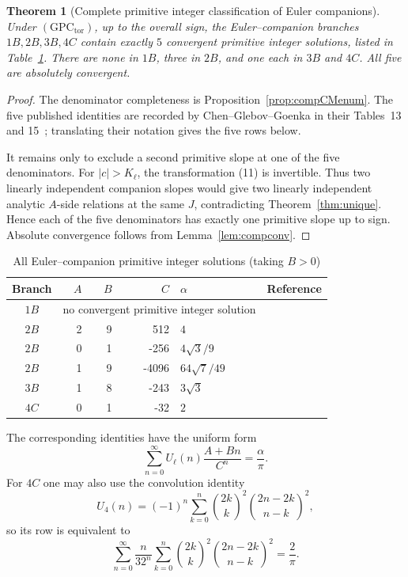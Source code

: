 \documentclass[11pt,a4paper]{amsart} %
\newtheorem{theorem}{Theorem}[section]
\theoremstyle{definition}
\begin{document}
\begin{theorem}[Complete primitive integer classification of Euler companions]
\label{thm:compcomplete}
Under \((\mathrm{GPC}_{\mathrm{tor}})\), up to the overall sign, the
Euler--companion branches \(1B,2B,3B,4C\) contain exactly \(5\) convergent
primitive integer solutions, listed in Table~\ref{tab:companion}. There are
none in \(1B\), three in \(2B\), and one each in \(3B\) and \(4C\). All five
are absolutely convergent.
\end{theorem}

\begin{proof}
The denominator completeness is Proposition~\ref{prop:compCMenum}. The five
published identities are recorded by Chen--Glebov--Goenka in their
Tables~13 and 15~\cite{CGG}; translating their notation gives the five rows
below.

It remains only to exclude a second primitive slope at one of the five
denominators. For \(|c|>K_\ell\), the transformation (11) is invertible.
Thus two linearly independent companion slopes would give two linearly
independent analytic \(A\)-side relations at the same \(J\), contradicting
Theorem~\ref{thm:unique}. Hence each of the five denominators has exactly one
primitive slope up to sign. Absolute convergence follows from
Lemma~\ref{lem:compconv}.
\end{proof}

\begin{table}[htbp]
\centering
\caption{All Euler--companion primitive integer solutions (taking \(B>0\))}
\label{tab:companion}
\small
\setlength{\tabcolsep}{5pt}
\renewcommand{\arraystretch}{1.18}
\begin{tabular}{@{}c r r r l l@{}}
\toprule
Branch & \(A\) & \(B\) & \(C\) & \(\alpha\) & Reference\\
\midrule
\(1B\)&\multicolumn{4}{c}{no convergent primitive integer solution}&\\
\(2B\)&2&9&512&\(4\)&\cite[Table~15]{CGG}\\
\(2B\)&0&1&-256&\(4\sqrt3/9\)&\cite[Table~15]{CGG}\\
\(2B\)&1&9&-4096&\(64\sqrt7/49\)&\cite[Table~15]{CGG}\\
\(3B\)&1&8&-243&\(3\sqrt3\)&\cite[Table~15]{CGG}\\
\(4C\)&0&1&-32&\(2\)&\cite[Table~13, Eq.~(49)]{CGG}\\
\bottomrule
\end{tabular}
\end{table}

The corresponding identities have the uniform form
\[
\sum_{n=0}^{\infty}U_\ell(n)\frac{A+Bn}{C^n}=\frac{\alpha}{\pi}.
\]
For \(4C\) one may also use the convolution identity
\[
U_4(n)=(-1)^n
\sum_{k=0}^{n}
\binom{2k}{k}^{2}
\binom{2n-2k}{n-k}^{2},
\]
so its row is equivalent to
\[
\sum_{n=0}^{\infty}\frac{n}{32^n}
\sum_{k=0}^{n}
\binom{2k}{k}^{2}
\binom{2n-2k}{n-k}^{2}
=\frac2\pi.
\]
\end{document}
